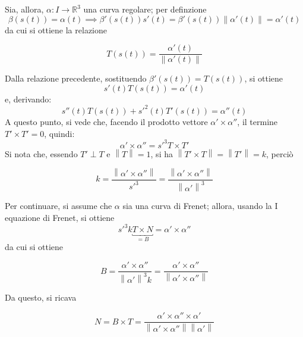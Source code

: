 \documentclass[12pt]{scrartcl}
\theoremstyle{style}
\newenvironment{boxenv}[1][]{
    \begin{eqbox}[#1]
    }{
   \end{eqbox}
}
\numberwithin{equation}{subsection}
\begin{document}
Sia, allora, $\alpha : I \to \mathbb{R}^3$ una curva regolare; per definzione
\[
	\beta (s(t))= \alpha (t) \implies \beta '(s(t)) s'(t) = \beta '(s(t)) \left\lVert \alpha '(t) \right\rVert = \alpha '(t)
\] 
da cui si ottiene la relazione
\begin{boxenv}[]
\[
	T(s(t)) = \frac{\alpha '(t)}{\left\lVert \alpha '(t) \right\rVert }
\] 
\end{boxenv}
\noindent Dalla relazione precedente, sostituendo $\beta '(s(t)) = T(s(t))$, si ottiene
\begin{equation}
	s'(t) T(s(t)) = \alpha '(t)
\end{equation}
e, derivando:
\[
s'' (t) T(s(t)) + s'^2(t) T'(s(t)) = \alpha ''(t)
\] 
A questo punto, si vede che, facendo il prodotto vettore $\alpha ' \times \alpha ''$, il termine $T' \times T' = 0$, quindi:
\begin{equation}
	\alpha ' \times \alpha '' = s'^3 T\times T'
\end{equation}
Si nota che, essendo $T ' \perp T $ e $\left\lVert T \right\rVert = 1$, si ha $\left\lVert T ' \times T \right\rVert = \left\lVert T' \right\rVert = k$, perci\`o
\begin{boxenv}[]
\[
k = \frac{\left\lVert \alpha '\times \alpha '' \right\rVert }{s'^3}= \frac{\left\lVert \alpha ' \times \alpha ''\right\rVert }{\left\lVert \alpha '\right\rVert ^3}
\] 
\end{boxenv}
\noindent Per continuare, si assume che $\alpha $ sia una curva di Frenet; allora, usando la I equazione di Frenet, si ottiene
\[
	s'^3 k \underbracket{T \times N }_{=B} = \alpha ' \times \alpha ''
\] 
da cui si ottiene
\begin{boxenv}[]
\[
B=\frac{\alpha '\times \alpha ''}{\left\lVert \alpha ' \right\rVert ^3 k} =\frac{\alpha ' \times \alpha ''}{\left\lVert \alpha ' \times \alpha '' \right\rVert }
\] 
\end{boxenv}
\noindent Da questo, si ricava 
\begin{boxenv}[]
\[
N = B \times T = \frac{\alpha ' \times \alpha '' \times \alpha '}{\left\lVert \alpha '\times \alpha '' \right\rVert \left\lVert \alpha ' \right\rVert }
\] 
\end{boxenv}
\end{document}
